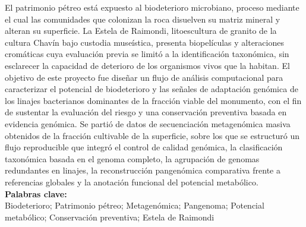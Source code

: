 \noindent
El patrimonio pétreo está expuesto al biodeterioro microbiano, proceso mediante el cual las comunidades que colonizan la roca disuelven su matriz mineral y alteran su superficie. La Estela de Raimondi, litoescultura de granito de la cultura Chavín bajo custodia museística, presenta biopelículas y alteraciones cromáticas cuya evaluación previa se limitó a la identificación taxonómica, sin esclarecer la capacidad de deterioro de los organismos vivos que la habitan. El objetivo de este proyecto fue diseñar un flujo de análisis computacional para caracterizar el potencial de biodeterioro y las señales de adaptación genómica de los linajes bacterianos dominantes de la fracción viable del monumento, con el fin de sustentar la evaluación del riesgo y una conservación preventiva basada en evidencia genómica. Se partió de datos de secuenciación metagenómica masiva obtenidos de la fracción cultivable de la superficie, sobre los que se estructuró un flujo reproducible que integró el control de calidad genómica, la clasificación taxonómica basada en el genoma completo, la agrupación de genomas redundantes en linajes, la reconstrucción pangenómica comparativa frente a referencias globales y la anotación funcional del potencial metabólico.\\


\noindent \textbf{Palabras clave:}\\
\noindent Biodeterioro; Patrimonio pétreo; Metagenómica; Pangenoma;
Potencial metabólico; Conservación preventiva; Estela de Raimondi